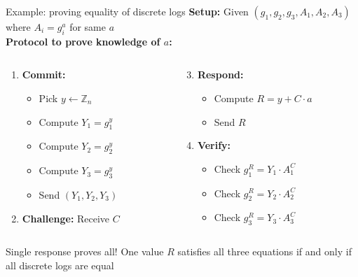 \documentclass[aspectratio=169, lualatex, handout]{beamer}
\begin{document}
\begin{frame}{Example: proving equality of discrete logs}
	\textbf{Setup:} Given $(g_1, g_2, g_3, A_1, A_2, A_3)$ where $A_i = g_i^a$ for same $a$\\
	\textbf{Protocol to prove knowledge of $a$:}
	\begin{columns}[c]
		\begin{column}{0.5\textwidth}
			\begin{enumerate}
				\item \textbf{Commit:}
				      \begin{itemize}
					      \item Pick $y \leftarrow \mathbb{Z}_n$
					      \item Compute $Y_1 = g_1^y$
					      \item Compute $Y_2 = g_2^y$
					      \item Compute $Y_3 = g_3^y$
					      \item Send $(Y_1, Y_2, Y_3)$
				      \end{itemize}
				\item \textbf{Challenge:} Receive $C$
			\end{enumerate}
		\end{column}
		\begin{column}{0.5\textwidth}
			\begin{enumerate}
				\setcounter{enumi}{2}
				\item \textbf{Respond:}
				      \begin{itemize}
					      \item Compute $R = y + C \cdot a$
					      \item Send $R$
				      \end{itemize}
				\item \textbf{Verify:}
				      \begin{itemize}
					      \item Check $g_1^R = Y_1 \cdot A_1^C$
					      \item Check $g_2^R = Y_2 \cdot A_2^C$
					      \item Check $g_3^R = Y_3 \cdot A_3^C$
				      \end{itemize}
			\end{enumerate}
		\end{column}
	\end{columns}
	\vspace{0.5em}
	\begin{alertblock}{Single response proves all!}
		One value $R$ satisfies all three equations if and only if all discrete logs are equal
	\end{alertblock}
\end{frame}
\end{document}
